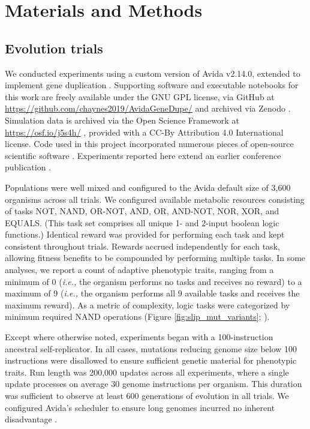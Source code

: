 \section{Materials and Methods} \label{sec:methods}

\subsection{Evolution trials}

We conducted experiments using a custom version of Avida v2.14.0, extended to implement gene duplication \citep{Ofria:2009avida}.
Supporting software and executable notebooks for this work are freely available under the GNU GPL license, via GitHub at \url{https://github.com/chaynes2019/AvidaGeneDupe/} and archived via Zenodo \citep{haynes_2025,https://doi.org/10.25495/7gxk-rd71}.
Simulation data is archived via the Open Science Framework at \url{https://osf.io/j5s4h/} \citep{Moreno_Haynes_2025,foster2017open}, provided with a CC-By Attribution 4.0 International license.
Code used in this project incorporated numerous pieces of open-source scientific software \citep{2020SciPy-NMeth,harris2020array,reback2020pandas,mckinney-proc-scipy-2010,waskom2021seaborn,hunter2007matplotlib,moreno2023teeplot,r_core_team_r:_2015}.
Experiments reported here extend an earlier conference publication \citep{lalejini2017gene}.

Populations were well mixed and configured to the Avida default size of 3,600 organisms across all trials.
We configured available metabolic resources consisting of tasks NOT, NAND, OR-NOT, AND, OR, AND-NOT, NOR, XOR, and EQUALS.
(This task set comprises all unique 1- and 2-input boolean logic functions.)
Identical reward was provided for performing each task and kept consistent throughout trials.
Rewards accrued independently for each task, allowing fitness benefits to be compounded by performing multiple tasks.
In some analyses, we report a count of adaptive phenotypic traits, ranging from a minimum of 0 (\textit{i.e.,} the organism performs no tasks and receives no reward) to a maximum of 9 (\textit{i.e.,} the organism performs all 9 available tasks and receives the maximum reward).
As a metric of complexity, logic tasks were categorized by minimum required NAND operations (Figure \ref{fig:slip_mut_variants}; \citealp{Lenski2003Evolutionary}).

Except where otherwise noted, experiments began with a 100-instruction ancestral self-replicator.
In all cases, mutations reducing genome size below 100 instructions were disallowed to ensure sufficient genetic material for phenotypic traits.
Run length was 200,000 updates across all experiments, where a single update processes on average 30 genome instructions per organism.
This duration was sufficient to observe at least 600 generations of evolution in all trials.
We configured Avida's scheduler to ensure long genomes incurred no inherent disadvantage \citep{Ofria:2009avida}.

